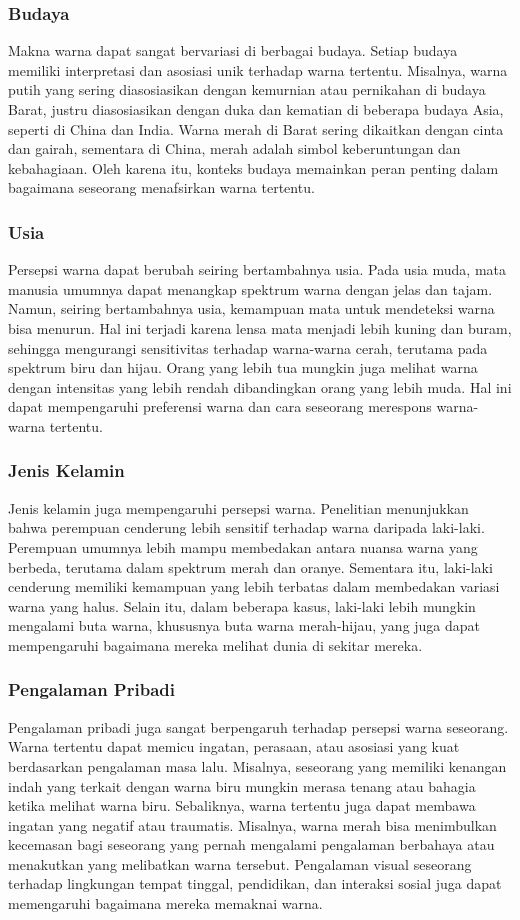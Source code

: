 \documentclass[a4paper]{article}
\begin{document}
\subsubsection{Budaya}
Makna warna dapat sangat bervariasi di berbagai budaya. Setiap budaya memiliki interpretasi dan asosiasi unik terhadap warna tertentu. Misalnya, warna putih yang sering diasosiasikan dengan kemurnian atau pernikahan di budaya Barat, justru diasosiasikan dengan duka dan kematian di beberapa budaya Asia, seperti di China dan India. Warna merah di Barat sering dikaitkan dengan cinta dan gairah, sementara di China, merah adalah simbol keberuntungan dan kebahagiaan. Oleh karena itu, konteks budaya memainkan peran penting dalam bagaimana seseorang menafsirkan warna tertentu.


\subsubsection{Usia}
Persepsi warna dapat berubah seiring bertambahnya usia. Pada usia muda, mata manusia umumnya dapat menangkap spektrum warna dengan jelas dan tajam. Namun, seiring bertambahnya usia, kemampuan mata untuk mendeteksi warna bisa menurun. Hal ini terjadi karena lensa mata menjadi lebih kuning dan buram, sehingga mengurangi sensitivitas terhadap warna-warna cerah, terutama pada spektrum biru dan hijau. Orang yang lebih tua mungkin juga melihat warna dengan intensitas yang lebih rendah dibandingkan orang yang lebih muda. Hal ini dapat mempengaruhi preferensi warna dan cara seseorang merespons warna-warna tertentu.


\subsubsection{Jenis Kelamin} Jenis kelamin juga mempengaruhi persepsi warna. Penelitian menunjukkan bahwa perempuan cenderung lebih sensitif terhadap warna daripada laki-laki. Perempuan umumnya lebih mampu membedakan antara nuansa warna yang berbeda, terutama dalam spektrum merah dan oranye. Sementara itu, laki-laki cenderung memiliki kemampuan yang lebih terbatas dalam membedakan variasi warna yang halus. Selain itu, dalam beberapa kasus, laki-laki lebih mungkin mengalami buta warna, khususnya buta warna merah-hijau, yang juga dapat mempengaruhi bagaimana mereka melihat dunia di sekitar mereka.


\subsubsection{Pengalaman Pribadi}
Pengalaman pribadi juga sangat berpengaruh terhadap persepsi warna seseorang. Warna tertentu dapat memicu ingatan, perasaan, atau asosiasi yang kuat berdasarkan pengalaman masa lalu. Misalnya, seseorang yang memiliki kenangan indah yang terkait dengan warna biru mungkin merasa tenang atau bahagia ketika melihat warna biru. Sebaliknya, warna tertentu juga dapat membawa ingatan yang negatif atau traumatis. Misalnya, warna merah bisa menimbulkan kecemasan bagi seseorang yang pernah mengalami pengalaman berbahaya atau menakutkan yang melibatkan warna tersebut. Pengalaman visual seseorang terhadap lingkungan tempat tinggal, pendidikan, dan interaksi sosial juga dapat memengaruhi bagaimana mereka memaknai warna.
\end{document}
